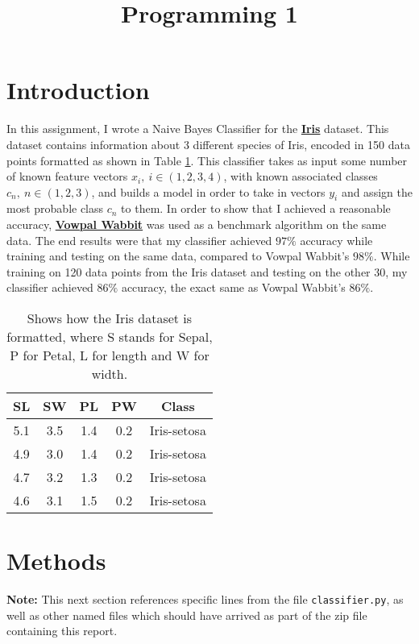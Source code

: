 \documentclass{article}
\title{Programming 1}
\begin{document}
 

\section{Introduction}
In this assignment, I wrote a Naive Bayes Classifier for the \textbf{\href{https://archive.ics.uci.edu/ml/machine-learning-databases/iris/}{Iris}} dataset. This dataset contains information about 3 different species of Iris, encoded in 150 data points formatted as shown in Table \ref{tab:iris-dataset-example}. This classifier takes as input some number of known feature vectors $x_i,\: i \in (1,2,3,4)$, with known associated classes $c_n,\: n \in (1,2,3)$, and builds a model in order to take in vectors $y_i$ and assign the most probable class $c_n$ to them. In order to show that I achieved a reasonable accuracy, \textbf{\href{https://github.com/JohnLangford/vowpal_wabbit/wiki}{Vowpal Wabbit}} was used as a benchmark algorithm on the same data. The end results were that my classifier achieved $97\%$ accuracy while training and testing on the same data, compared to Vowpal Wabbit's $98\%$. While training on 120 data points from the Iris dataset and testing on the other 30, my classifier achieved $86\%$ accuracy, the exact same as Vowpal Wabbit's $86\%$.

\begin{table}[h]
  \centering
  \begin{tabular}{|c|c|c|c|c|}
  	\hline
    SL & SW & PL & PW & Class \\
    \hline
    5.1 & 3.5 & 1.4 & 0.2 & Iris-setosa \\
	4.9&3.0&1.4&0.2&Iris-setosa \\
	4.7&3.2&1.3&0.2&Iris-setosa \\ 
	4.6&3.1&1.5&0.2&Iris-setosa \\
    \hline
  \end{tabular}
  \caption{Shows how the Iris dataset is formatted, where S stands for Sepal, P for Petal, L for length and W for width.}
\label{tab:iris-dataset-example}
\end{table}

\section{Methods}
\textbf{Note:} This next section references specific lines from the file \texttt{classifier.py}, as well as other named files which should have arrived as part of the zip file containing this report. 
\end{document}
